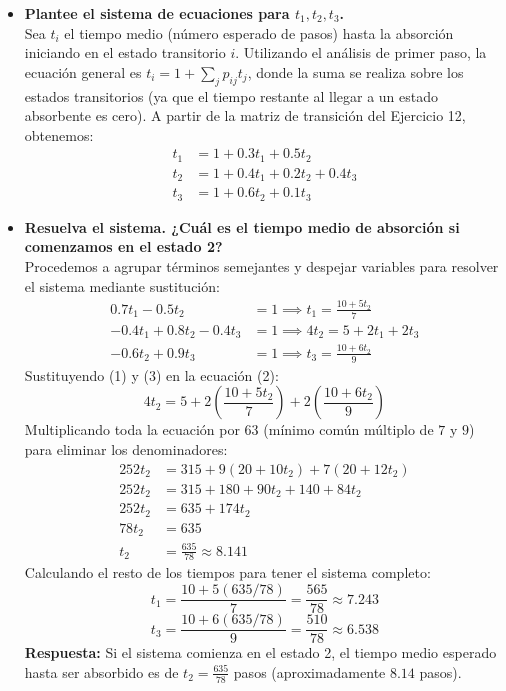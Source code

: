 \documentclass[10pt,a4paper]{book}
\begin{document}
\begin{itemize}
    \item[\textbf{a)}] \textbf{Plantee el sistema de ecuaciones para $t_1, t_2, t_3$.} \\
    Sea $t_i$ el tiempo medio (número esperado de pasos) hasta la absorción iniciando en el estado transitorio $i$. Utilizando el análisis de primer paso, la ecuación general es $t_i = 1 + \sum_{j} p_{ij} t_j$, donde la suma se realiza sobre los estados transitorios (ya que el tiempo restante al llegar a un estado absorbente es cero). 
    A partir de la matriz de transición del Ejercicio 12, obtenemos:
    \begin{align*}
        t_1 &= 1 + 0.3t_1 + 0.5t_2 \\
        t_2 &= 1 + 0.4t_1 + 0.2t_2 + 0.4t_3 \\
        t_3 &= 1 + 0.6t_2 + 0.1t_3
    \end{align*}

    \item[\textbf{b)}] \textbf{Resuelva el sistema. ¿Cuál es el tiempo medio de absorción si comenzamos en el estado 2?} \\
    Procedemos a agrupar términos semejantes y despejar variables para resolver el sistema mediante sustitución:
    \begin{align}
        0.7t_1 - 0.5t_2 &= 1 \implies t_1 = \frac{10 + 5t_2}{7} \\
        -0.4t_1 + 0.8t_2 - 0.4t_3 &= 1 \implies 4t_2 = 5 + 2t_1 + 2t_3 \\
        -0.6t_2 + 0.9t_3 &= 1 \implies t_3 = \frac{10 + 6t_2}{9}
    \end{align}
    Sustituyendo (1) y (3) en la ecuación (2):
    \[ 4t_2 = 5 + 2\left(\frac{10 + 5t_2}{7}\right) + 2\left(\frac{10 + 6t_2}{9}\right) \]
    Multiplicando toda la ecuación por $63$ (mínimo común múltiplo de $7$ y $9$) para eliminar los denominadores:
    \begin{align*}
        252t_2 &= 315 + 9(20 + 10t_2) + 7(20 + 12t_2) \\
        252t_2 &= 315 + 180 + 90t_2 + 140 + 84t_2 \\
        252t_2 &= 635 + 174t_2 \\
        78t_2 &= 635 \\
        t_2 &= \frac{635}{78} \approx 8.141
    \end{align*}
    Calculando el resto de los tiempos para tener el sistema completo:
    \[ t_1 = \frac{10 + 5(635/78)}{7} = \frac{565}{78} \approx 7.243 \]
    \[ t_3 = \frac{10 + 6(635/78)}{9} = \frac{510}{78} \approx 6.538 \]
    \textbf{Respuesta:} Si el sistema comienza en el estado 2, el tiempo medio esperado hasta ser absorbido es de $t_2 = \frac{635}{78}$ pasos (aproximadamente $8.14$ pasos).
\end{itemize}
\end{document}
